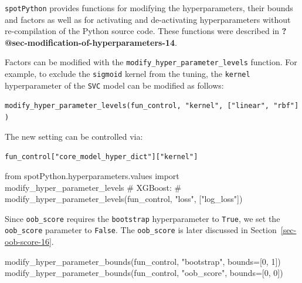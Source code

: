 \documentclass[
  letterpaper,
  DIV=11,
  numbers=noendperiod]{scrreprt}
\newenvironment{Shaded}{\begin{snugshade}}{\end{snugshade}}
\newcommand{\CommentTok}[1]{\textcolor[rgb]{0.37,0.37,0.37}{#1}}
\newcommand{\DecValTok}[1]{\textcolor[rgb]{0.68,0.00,0.00}{#1}}
\newcommand{\ImportTok}[1]{\textcolor[rgb]{0.00,0.46,0.62}{#1}}
\newcommand{\NormalTok}[1]{\textcolor[rgb]{0.00,0.23,0.31}{#1}}
\newcommand{\OperatorTok}[1]{\textcolor[rgb]{0.37,0.37,0.37}{#1}}
\newcommand{\StringTok}[1]{\textcolor[rgb]{0.13,0.47,0.30}{#1}}
\begin{document}
\texttt{spotPython} provides functions for modifying the
hyperparameters, their bounds and factors as well as for activating and
de-activating hyperparameters without re-compilation of the Python
source code. These functions were described in
\textbf{?@sec-modification-of-hyperparameters-14}.

Factors can be modified with the
\texttt{modify\_hyper\_parameter\_levels} function. For example, to
exclude the \texttt{sigmoid} kernel from the tuning, the \texttt{kernel}
hyperparameter of the \texttt{SVC} model can be modified as follows:

\texttt{modify\_hyper\_parameter\_levels(fun\_control,\ "kernel",\ {[}"linear",\ "rbf"{]})}

The new setting can be controlled via:

\texttt{fun\_control{[}"core\_model\_hyper\_dict"{]}{[}"kernel"{]}}

\begin{Shaded}
\begin{Highlighting}[]
\ImportTok{from}\NormalTok{ spotPython.hyperparameters.values }\ImportTok{import}\NormalTok{ modify\_hyper\_parameter\_levels}
\CommentTok{\# XGBoost:}
\CommentTok{\# modify\_hyper\_parameter\_levels(fun\_control, "loss", ["log\_loss"])}
\end{Highlighting}
\end{Shaded}

\begin{tcolorbox}[enhanced jigsaw, rightrule=.15mm, opacityback=0, colframe=quarto-callout-note-color-frame, opacitybacktitle=0.6, toptitle=1mm, arc=.35mm, colbacktitle=quarto-callout-note-color!10!white, coltitle=black, toprule=.15mm, leftrule=.75mm, titlerule=0mm, title=\textcolor{quarto-callout-note-color}{\faInfo}\hspace{0.5em}{Note: RandomForestClassifier and Out-of-bag Estimation}, bottomrule=.15mm, breakable, bottomtitle=1mm, left=2mm, colback=white]

Since \texttt{oob\_score} requires the \texttt{bootstrap} hyperparameter
to \texttt{True}, we set the \texttt{oob\_score} parameter to
\texttt{False}. The \texttt{oob\_score} is later discussed in
Section~\ref{sec-oob-score-16}.

\end{tcolorbox}

\begin{Shaded}
\begin{Highlighting}[]
\NormalTok{modify\_hyper\_parameter\_bounds(fun\_control, }\StringTok{"bootstrap"}\NormalTok{, bounds}\OperatorTok{=}\NormalTok{[}\DecValTok{0}\NormalTok{, }\DecValTok{1}\NormalTok{])}
\NormalTok{modify\_hyper\_parameter\_bounds(fun\_control, }\StringTok{"oob\_score"}\NormalTok{, bounds}\OperatorTok{=}\NormalTok{[}\DecValTok{0}\NormalTok{, }\DecValTok{0}\NormalTok{])}
\end{Highlighting}
\end{Shaded}
\end{document}
